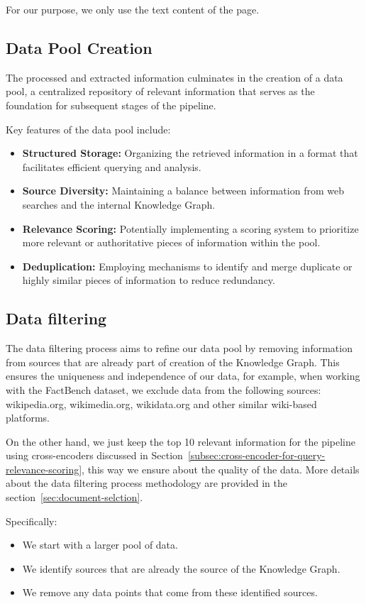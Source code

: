 For our purpose, we only use the text content of the page.
\subsection{Data Pool Creation}\label{subsec:data-pool-creation}
The processed and extracted information culminates in the creation of a data pool, a centralized repository of relevant information that serves as the foundation for subsequent stages of the pipeline.

Key features of the data pool include:
\begin{itemize}
    \item \textbf{Structured Storage:} Organizing the retrieved information in a format that facilitates efficient querying and analysis.
    \item \textbf{Source Diversity:} Maintaining a balance between information from web searches and the internal Knowledge Graph.
    \item \textbf{Relevance Scoring:} Potentially implementing a scoring system to prioritize more relevant or authoritative pieces of information within the pool.
    \item \textbf{Deduplication:} Employing mechanisms to identify and merge duplicate or highly similar pieces of information to reduce redundancy.
\end{itemize}
\subsection{Data filtering}\label{subsec:data-filtering}
The data filtering process aims to refine our data pool by removing information from sources that are already part of creation of the Knowledge Graph.
This ensures the uniqueness and independence of our data, for example, when working with the FactBench dataset, we exclude data from the following sources: wikipedia.org, wikimedia.org, wikidata.org and other similar wiki-based platforms.

On the other hand, we just keep the top 10 relevant information for the pipeline using cross-encoders discussed in Section~\ref{subsec:cross-encoder-for-query-relevance-scoring}, this way we ensure about the quality of the data.
More details about the data filtering process methodology are provided in the section~\ref{sec:document-selction}.

Specifically:
\begin{itemize}
    \item We start with a larger pool of data.
    \item We identify sources that are already the source of the Knowledge Graph.
    \item We remove any data points that come from these identified sources.
\end{itemize}

